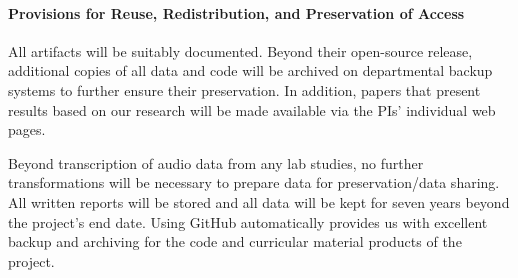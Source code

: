 \documentclass[11pt]{article}
\begin{document}
\paragraph{Provisions for Reuse, Redistribution, and Preservation of Access}
All artifacts will be suitably documented. Beyond their open-source release,
additional copies of all data and code will be archived on departmental backup
systems to further ensure their preservation. In addition, papers that present
results based on our research will be made available via the PIs' individual web
pages.

Beyond transcription of audio data from any lab studies, no further
transformations will be necessary to prepare data for preservation/data
sharing. All written reports will be stored and all data will be kept for seven
years beyond the project's end date.  Using GitHub automatically provides us
with excellent backup and archiving for the code and curricular material
products of the project.
\end{document}
